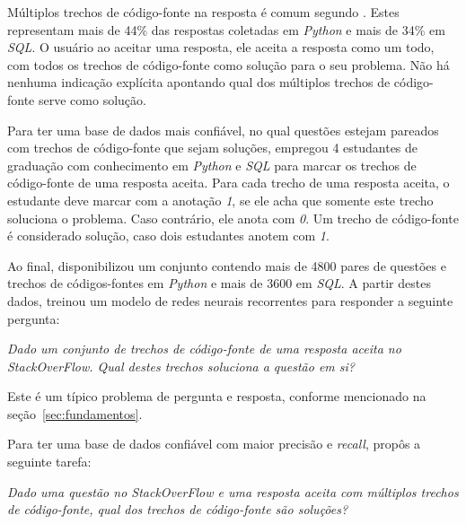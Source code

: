 Múltiplos trechos de código-fonte na resposta é comum segundo \cite{yao-2018}. Estes representam mais de 44\% das respostas coletadas em \textit{Python} e mais de 34\% em \textit{SQL}. O usuário ao aceitar uma resposta, ele aceita a resposta como um todo, com todos os trechos de código-fonte como solução para o seu problema. Não há nenhuma indicação explícita apontando qual dos múltiplos trechos de código-fonte serve como solução. 

Para ter uma base de dados mais confiável, no qual questões estejam pareados com trechos de código-fonte que sejam soluções, \cite{yao-2018} empregou 4 estudantes de graduação com conhecimento em \textit{Python} e \textit{SQL} para marcar os trechos de código-fonte de uma resposta aceita. Para cada trecho de uma resposta aceita, o estudante deve marcar com a anotação \emph{1}, se ele acha que somente este trecho soluciona o problema. Caso contrário, ele anota com \emph{0}. Um trecho de código-fonte é considerado solução, caso dois estudantes anotem com \emph{1}.

Ao final, \cite{yao-2018} disponibilizou um conjunto contendo mais de 4800 pares de questões e trechos de códigos-fontes em \textit{Python} e mais de 3600 em \textit{SQL}. A partir destes dados, \cite{yao-2018} treinou um modelo de redes neurais recorrentes para responder a seguinte pergunta:

\emph{Dado um conjunto de trechos de código-fonte de uma resposta aceita no StackOverFlow. Qual destes trechos soluciona a questão em si?}

Este é um típico problema de pergunta e resposta, conforme mencionado na seção~\ref{sec:fundamentos}. 

Para ter uma base de dados confiável com maior precisão e \textit{recall}, \cite{yao-2018} propôs a seguinte tarefa:

\emph{Dado uma questão no \textit{StackOverFlow} e uma resposta aceita com múltiplos trechos de código-fonte, qual dos trechos de código-fonte são soluções?}






